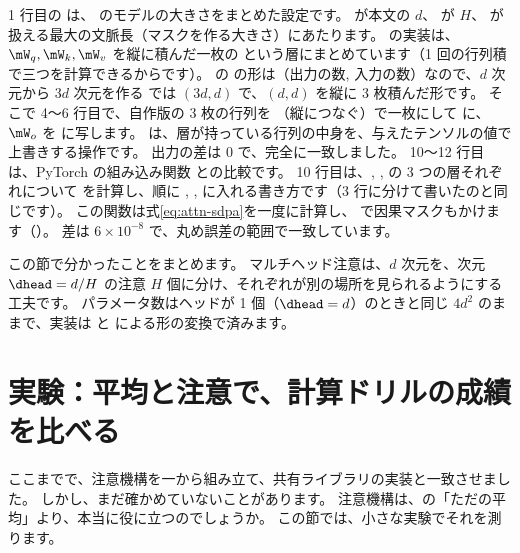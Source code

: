 
1 行目の  は、 のモデルの大きさをまとめた設定です。
 が本文の $d$、 が $H$、 が扱える最大の文脈長（マスクを作る大きさ）にあたります。
 の実装は、$\mW_q,\mW_k,\mW_v$ を縦に積んだ一枚の  という層にまとめています（1 回の行列積で三つを計算できるからです）。
 の  の形は（出力の数, 入力の数）なので、$d$ 次元から $3d$ 次元を作る  では $(3d,d)$ で、$(d,d)$ を縦に 3 枚積んだ形です。
そこで 4〜6 行目で、自作版の 3 枚の行列を （縦につなぐ）で一枚にして  に、$\mW_o$ を  に写します。
 は、層が持っている行列の中身を、与えたテンソルの値で上書きする操作です。
出力の差は 0 で、完全に一致しました。
10〜12 行目は、PyTorch の組み込み関数  との比較です。
10 行目は、, ,  の 3 つの層それぞれについて  を計算し、順に , ,  に入れる書き方です（3 行に分けて書いたのと同じです）。
この関数は式\eqref{eq:attn-sdpa}を一度に計算し、 で因果マスクもかけます（）。
差は $6\times10^{-8}$ で、丸め誤差の範囲で一致しています。

この節で分かったことをまとめます。
マルチヘッド注意は、$d$ 次元を、次元 $\dhead=d/H$ の注意 $H$ 個に分け、それぞれが別の場所を見られるようにする工夫です。
パラメータ数はヘッドが 1 個（$\dhead=d$）のときと同じ $4d^2$ のままで、実装は  と  による形の変換で済みます。

\section{実験：平均と注意で、計算ドリルの成績を比べる}\label{sec:attn-experiment}

ここまでで、注意機構を一から組み立て、共有ライブラリの実装と一致させました。
しかし、まだ確かめていないことがあります。
注意機構は、の「ただの平均」より、本当に役に立つのでしょうか。
この節では、小さな実験でそれを測ります。

